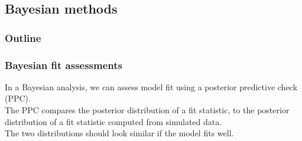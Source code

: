 \documentclass[color=usenames,dvipsnames]{beamer}\usepackage[]{graphicx}\usepackage[]{xcolor}
\begin{document}












\subsection{Bayesian methods}



\begin{frame}[plain]
  \frametitle{Outline}
  \Large
\end{frame}




\begin{frame}[fragile]
  \frametitle{Bayesian fit assessments}
  In a Bayesian analysis, we can assess model fit using a
  \alert{posterior predictive check} (PPC). \\
  \pause
  \vfill
  The PPC compares the posterior distribution of a fit statistic, to
  the posterior distribution of a fit statistic computed from
  simulated data. \\ 
  \pause
  \vfill
  The two distributions should look similar if the model fits well. \\
\end{frame}
\end{document}
